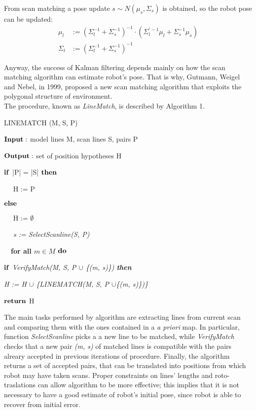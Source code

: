 \documentclass[a4paper, onecolumn]{report}
\begin{document}
From scan matching a pose update $s \sim N(\mu_s, \Sigma_s)$ is obtained, so the robot pose can be updated:
\begin{equation}
	\begin{aligned}
		\mu_l &:= (\Sigma_l^{-1} + \Sigma_s^{-1})^{-1} \cdot (\Sigma_l^{'-1}\mu_l + \Sigma_s^{-1}\mu_s) \\
		\Sigma_l &:= (\Sigma_l^{-1} + \Sigma_s^{-1})^{-1}
	\end{aligned}
\end{equation}

Anyway, the success of Kalman filtering depends mainly on how the scan matching algorithm can estimate robot's pose. That is why, Gutmann, Weigel and Nebel, in 1999, proposed a new scan matching algorithm that exploits the polygonal structure of environment. \\
The procedure, known as \emph{LineMatch}, is described by Algorithm 1.
\begin{algorithm}
	\caption{\mbox{LINEMATCH} (M, S, P)}
	\begin{algorithmic}[1]
		\item{$\bf{Input:} $ model lines M, scan lines S, pairs P}
		\item{$\bf{Output:} $ set of position hypotheses H}
		\item{$\bf{if}$ |P| = |S| $\bf{then}$}
		\item{$\quad$ H := P}
		\item{$\bf{else}$}
		\item{$\quad$ H := $\emptyset$}
		\item{\emph{$\quad$ s := SelectScanline(S, P)}}
		\item{$\quad$\bf{for all} $m \in M$ $\bf{do}$}
		\item{\qquad $\bf{if}$ \emph{VerifyMatch(M, S, P $\cup$ \{(m, s)\}) \bf{then}}}
		\item{\quad \qquad \emph{H := H $\cup$ \{\mbox{LINEMATCH}(M, S, P   $\cup$\{(m, s)\})\}}}
		\item{$\bf{return}$ H}	
	\end{algorithmic}
\end{algorithm}
The main tasks performed by algorithm are extracting lines from current scan and comparing them with the ones contained in a \emph{a priori} map. In particular, function \emph{SelectScanline} picks a a new line to be matched, while \emph{VerifyMatch} checks that a new pair \emph{(m, s)} of matched lines is compatible with the pairs alreary accepted in previous iterations of procedure. Finally, the algorithm returns a set of accepted pairs, that can be translated into positions from which robot may have taken scans. Proper constraints on lines' lengths and roto-traslations can allow algorithm to be more effective; this implies that it is not necessary to have a good estimate of robot's initial pose, since robot is able to recover from initial error.  
\end{document}
